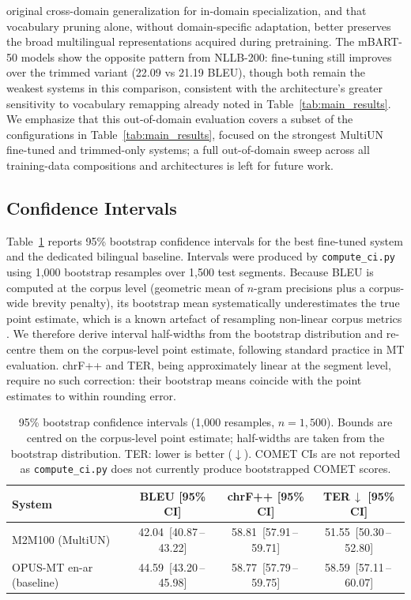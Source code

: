 \documentclass{article}
\begin{document}
	original cross-domain generalization for in-domain specialization, and that
	vocabulary pruning alone, without domain-specific adaptation, better preserves the
	broad multilingual representations acquired during pretraining. The mBART-50
	models show the opposite pattern from NLLB-200: fine-tuning still improves over
	the trimmed variant (22.09 vs 21.19 BLEU), though both remain the weakest systems
	in this comparison, consistent with the architecture's greater sensitivity to
	vocabulary remapping already noted in Table~\ref{tab:main_results}. We emphasize
	that this out-of-domain evaluation covers a subset of the configurations in
	Table~\ref{tab:main_results}, focused on the strongest MultiUN fine-tuned and
	trimmed-only systems; a full out-of-domain sweep across all training-data
	compositions and architectures is left for future work.
	
	\subsection{Confidence Intervals}
	\label{sec:ci}
	
	Table~\ref{tab:ci} reports 95\% bootstrap confidence intervals for the best
	fine-tuned system and the dedicated bilingual baseline. Intervals were produced
	by \texttt{compute\_ci.py} using 1,000 bootstrap resamples over 1,500 test
	segments. Because BLEU is computed at the corpus level (geometric mean of
	$n$-gram precisions plus a corpus-wide brevity penalty), its bootstrap mean
	systematically underestimates the true point estimate, which is a known artefact of
	resampling non-linear corpus metrics \citep{koehn2004bleu}. We therefore
	derive interval half-widths from the bootstrap distribution and re-centre them
	on the corpus-level point estimate, following standard practice in MT evaluation.
	chrF++ and TER, being approximately linear at the segment level, require no
	such correction: their bootstrap means coincide with the point estimates to
	within rounding error.
	\begin{table}[h]
		\caption{95\% bootstrap confidence intervals (1,000 resamples, $n=1,500$).
			Bounds are centred on the corpus-level point estimate; half-widths are taken
			from the bootstrap distribution. TER: lower is better ($\downarrow$). COMET CIs are not reported as \texttt{compute\_ci.py} does not currently
			produce bootstrapped COMET scores.}
		\label{tab:ci}
		\centering
		\small
		\begin{tabular}{lccc}
			\toprule
			\textbf{System} & \textbf{BLEU [95\% CI]} & \textbf{chrF++ [95\% CI]} & \textbf{TER\,$\downarrow$ [95\% CI]} \\
			\midrule
			M2M100 (MultiUN)           & 42.04 \,[40.87\,--\,43.22] & 58.81 \,[57.91\,--\,59.71] & 51.55 \,[50.30\,--\,52.80] \\
			OPUS-MT en-ar (baseline)   & 44.59 \,[43.20\,--\,45.98] & 58.77 \,[57.79\,--\,59.75] & 58.59 \,[57.11\,--\,60.07] \\
			\bottomrule
		\end{tabular}
	\end{table}
	
\end{document}
